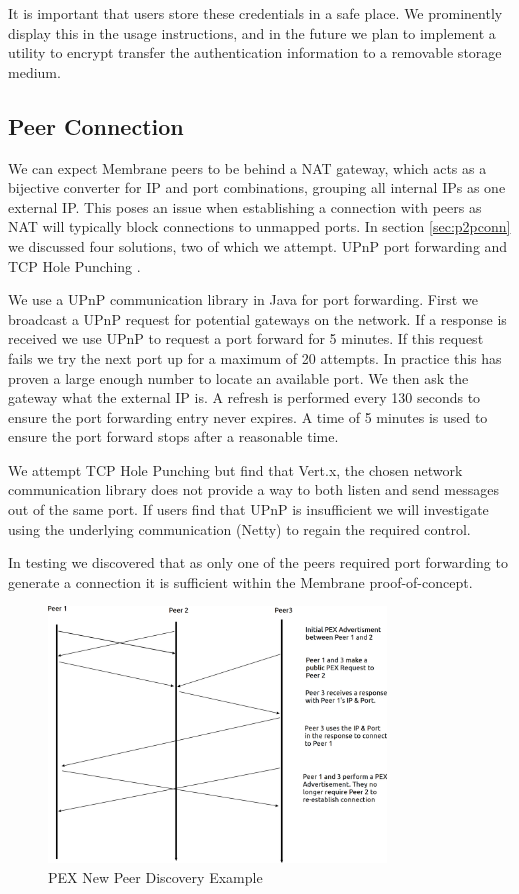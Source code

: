 \documentclass[11pt, a4paper, twoside]{report}
\begin{document}
It is important that users store these credentials in a safe place. We prominently display this in the usage instructions, and in the future we plan to implement a utility to encrypt transfer the authentication information to a removable storage medium.

\subsection{Peer Connection}

We can expect Membrane peers to be behind a NAT gateway, which acts as a bijective converter for IP and port combinations, grouping all internal IPs as one external IP. This poses an issue when establishing a connection with peers as NAT will typically block connections to unmapped ports. In section \ref{sec:p2pconn} we discussed four solutions, two of which we attempt. UPnP port forwarding \citep{boucadair2013universal} and TCP Hole Punching \citep{wing2010traversal}.

We use a UPnP communication library in Java for port forwarding. First we broadcast a UPnP request for potential gateways on the network. If a response is received we use UPnP to request a port forward for 5 minutes. If this request fails we try the next port up for a maximum of 20 attempts. In practice this has proven a large enough number to locate an available port. We then ask the gateway what the external IP is. A refresh is performed every 130 seconds to ensure the port forwarding entry never expires. A time of 5 minutes is used to ensure the port forward stops after a reasonable time.

We attempt TCP Hole Punching but find that Vert.x, the chosen network communication library does not provide a way to both listen and send messages out of the same port. If users find that UPnP is insufficient we will investigate using the underlying communication (Netty) to regain the required control.

In testing we discovered that as only one of the peers required port forwarding to generate a connection it is sufficient within the Membrane proof-of-concept.

\begin{figure}[!ht]
 \centering
 \includegraphics[width=0.8\textwidth]{pex-new-peer}
 \caption{PEX New Peer Discovery Example}
 \label{fig:pex-new-peer}
\end{figure}
\end{document}
